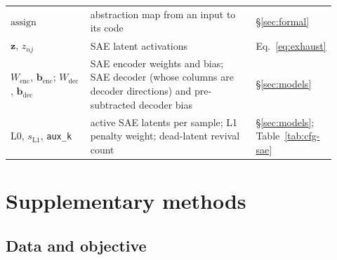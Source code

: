 \begin{longtable}{@{}>{\raggedright\arraybackslash}p{0.25\linewidth}%
>{\raggedright\arraybackslash}p{0.52\linewidth}%
>{\raggedright\arraybackslash}p{0.15\linewidth}@{}}
$\mathrm{assign}$ & abstraction map from an input to its code & §\ref{sec:formal} \\
$\mathbf{z}$, $z_{nj}$ & SAE latent activations & Eq.~\eqref{eq:exhaust} \\
$W_{\mathrm{enc}}$, $\mathbf{b}_{\mathrm{enc}}$; $W_{\mathrm{dec}}$, $\mathbf{b}_{\mathrm{dec}}$ & SAE encoder weights and bias; SAE decoder (whose columns are decoder directions) and pre-subtracted decoder bias & §\ref{sec:models} \\
$\mathrm{L0}$, $s_{\mathrm{L1}}$, \texttt{aux\_k} & active SAE latents per sample; L1 penalty weight; dead-latent revival count & §\ref{sec:models}; Table~\ref{tab:cfg-sae} \\
\end{longtable}
\endgroup

\section{Supplementary methods}
\label{app:methods}

\subsection{Data and objective}
\label{app:data}

